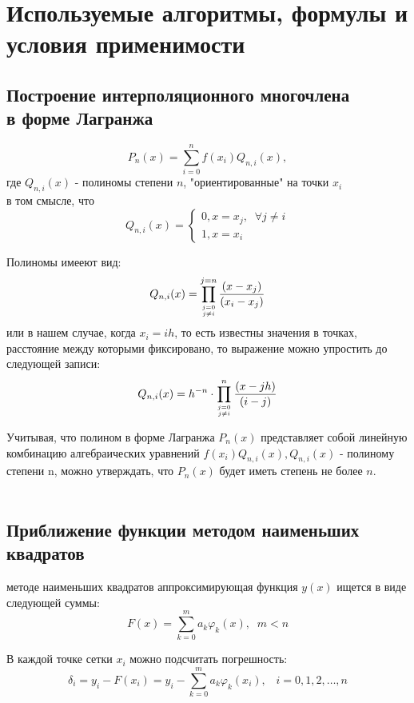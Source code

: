 \documentclass[a4paper, 14pt]{extreport}
\begin{document}
\section*{Используемые алгоритмы, формулы и условия применимости}
\subsection*{Построение интерполяционного многочлена \\ в форме Лагранжа}

$$P_{n}(x) = \sum_{i = 0}^{n} f\left(x_{i}\right) Q_{n, i}(x),$$
где $Q_{n, i}(x)$ - полиномы степени $n$, "ориентированные" на точки $x_{i}$ \\ в том смысле, что
$$
Q_{n, i}(x)=\left\{\begin{array}{l}0, x=x_{j}, \; \; \forall j \neq i \\ 1, x=x_{i}\end{array}\right. $$

{Полиномы имееют вид: $$Q_{n, i}(x)=\prod_{j=0 \atop j \neq i}^{j=n} \frac{\left(x-x_{j}\right)}{\left(x_{i}-x_{j}\right)}$$}
или в нашем случае, когда $x_{i} = ih$, то есть известны значения в точках, расстояние между которыми фиксировано, то выражение можно упростить до следующей записи:
$$	
Q_{n, i}(x)=h^{-n} \cdot \prod_{j=0 \atop j \neq i}^{n} \frac{(x-j h)}{(i-j)}
$$

Учитывая, что полином в форме Лагранжа $P_{n}(x)$ представляет собой линейную комбинацию алгебраических уравнений $f(x_{i})Q_{n, i}(x), Q_{n, i}(x)$ - полиному степени n, можно утверждать, что $P_{n}(x)$ будет иметь степень не более $n$.
\\ \\
\subsection*{Приближение функции методом наименьших квадратов}

 методе наименьших квадратов аппроксимирующая функция $y(x)$ ищется в виде следующей суммы:
$$F(x)=\sum_{k=0}^{m} a_{k} \varphi_{k}(x), \; \; m<n$$

{В каждой точке сетки $x_{i}$ можно подсчитать погрешность:}
$$\delta_{i}=y_{i}-F\left(x_{i}\right)=y_{i}-\sum_{k=0}^{m} a_{k} \varphi_{k}\left(x_{i}\right), \; \; \; i=0,1,2, \ldots, n$$
\end{document}
